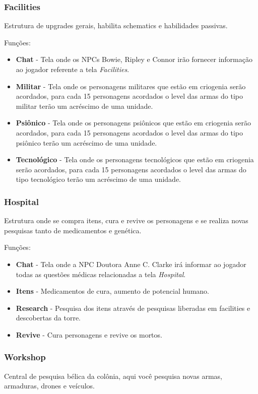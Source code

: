 \documentclass[11pt]{article} %
\begin{document}
\subsubsection{Facilities}
Estrutura de upgrades gerais, habilita schematics e habilidades passivas.

Funções:
\begin{itemize}
  \item \textbf{Chat} - Tela onde os NPCs Bowie, Ripley e Connor irão fornecer informação ao jogador referente a tela \textit{Facilities}.
  \item \textbf{Militar} - Tela onde os personagens militares que estão em criogenia serão acordados, para cada 15 personagens acordados o level das armas do tipo militar terão um acréscimo de uma unidade.
  \item \textbf{Psiônico} - Tela onde os personagens psiônicos que estão em criogenia serão acordados, para cada 15 personagens acordados o level das armas do tipo psiônico terão um acréscimo de uma unidade.
  \item \textbf{Tecnológico} - Tela onde os personagens tecnológicos que estão em criogenia serão acordados, para cada 15 personagens acordados o level das armas do tipo tecnológico terão um acréscimo de uma unidade.
\end{itemize}

\subsubsection{Hospital}
Estrutura onde se compra itens, cura e revive os personagens e se realiza novas pesquisas tanto de medicamentos e genética. 

Funções:
\begin{itemize}
  \item \textbf{Chat} - Tela onde a NPC Doutora Anne C. Clarke irá informar ao jogador todas as questões médicas relacionadas a tela \textit{Hospital}.
  \item \textbf{Itens} - Medicamentos de cura, aumento de potencial humano. 
  \item \textbf{Research} - Pesquisa dos itens através de pesquisas liberadas em facilities e descobertas da torre.
  \item \textbf{Revive} - Cura personagens e revive os mortos. 
\end{itemize}

\subsubsection{Workshop}
Central de pesquisa bélica da colônia, aqui você pesquisa novas armas, armaduras, drones e veículos.
\end{document}
